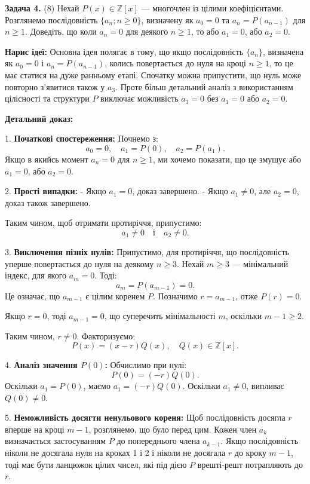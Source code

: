 \documentclass{article}
\begin{document}
\noindent\textbf{Задача 4.} (8) Нехай \( P(x) \in \mathbb{Z}[x] \) — многочлен із цілими коефіцієнтами. Розглянемо послідовність \( \{a_n; n \geq 0\} \), визначену як \( a_0 = 0 \) та \( a_n = P(a_{n-1}) \) для \( n \geq 1 \). Доведіть, що коли \( a_n = 0 \) для деякого \( n \geq 1 \), то або \( a_1 = 0 \), або \( a_2 = 0 \).

\textbf{Нарис ідеї:}
Основна ідея полягає в тому, що якщо послідовність \( \{a_n\} \), визначена як \( a_0=0 \) і \( a_n=P(a_{n-1}) \), колись повертається до нуля на кроці \( n \geq 1 \), то це має статися на дуже ранньому етапі. Спочатку можна припустити, що нуль може повторно з'явитися також у \( a_3 \). Проте більш детальний аналіз з використанням цілісності та структури \( P \) виключає можливість \( a_3 = 0 \) без \( a_1 = 0 \) або \( a_2 = 0 \).

\textbf{Детальний доказ:}

1. \textbf{Початкові спостереження:}
   Почнемо з:
   \[
   a_0 = 0, \quad a_1 = P(0), \quad a_2 = P(a_1).
   \]
   Якщо в якийсь момент \( a_n = 0 \) для \( n \geq 1 \), ми хочемо показати, що це змушує або \( a_1 = 0 \), або \( a_2 = 0 \).

2. \textbf{Прості випадки:}
   - Якщо \( a_1 = 0 \), доказ завершено.
   - Якщо \( a_1 \neq 0 \), але \( a_2 = 0 \), доказ також завершено.

   Таким чином, щоб отримати протиріччя, припустимо:
   \[
   a_1 \neq 0 \quad \text{і} \quad a_2 \neq 0.
   \]

3. \textbf{Виключення пізніх нулів:}
   Припустимо, для протиріччя, що послідовність уперше повертається до нуля на деякому \( n \geq 3 \). Нехай \( m \geq 3 \) — мінімальний індекс, для якого \( a_m = 0 \). Тоді:
   \[
   a_m = P(a_{m-1}) = 0.
   \]
   Це означає, що \( a_{m-1} \) є цілим коренем \( P \). Позначимо \( r = a_{m-1} \), отже \( P(r) = 0 \).

   Якщо \( r = 0 \), тоді \( a_{m-1} = 0 \), що суперечить мінімальності \( m \), оскільки \( m-1 \geq 2 \).

   Таким чином, \( r \neq 0 \). Факторизуємо:
   \[
   P(x) = (x-r)Q(x), \quad Q(x) \in \mathbb{Z}[x].
   \]

4. \textbf{Аналіз значення \( P(0) \):}
   Обчислимо при нулі:
   \[
   P(0) = (-r)Q(0).
   \]
   Оскільки \( a_1 = P(0) \), маємо \( a_1 = (-r)Q(0) \). Оскільки \( a_1 \neq 0 \), випливає \( Q(0) \neq 0 \).

5. \textbf{Неможливість досягти ненульового кореня:}
   Щоб послідовність досягла \( r \) вперше на кроці \( m-1 \), розглянемо, що було перед цим. Кожен член \( a_k \) визначається застосуванням \( P \) до попереднього члена \( a_{k-1} \). Якщо послідовність ніколи не досягала нуля на кроках 1 і 2 і ніколи не досягала \( r \) до кроку \( m-1 \), тоді має бути ланцюжок цілих чисел, які під дією \( P \) врешті-решт потрапляють до \( r \).
\end{document}
